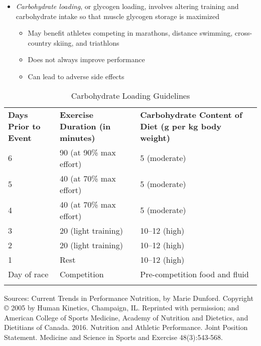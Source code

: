 \documentclass[title={Chapter 11}]{fdsn201notes}
\begin{document}
\begin{itemize}
	\item \emph{Carbohydrate loading}, or glycogen loading, involves altering training and carbohydrate intake so that muscle glycogen storage is maximized
	\begin{itemize}
		\item May benefit athletes competing in marathons, distance swimming, cross-country skiing, and triathlons
		\item Does not always improve performance
		\item Can lead to adverse side effects
	\end{itemize}
\end{itemize}

\begin{table}[H]
	\centering
	\begin{threeparttable}
		\caption{Carbohydrate Loading Guidelines}
		\label{tab:carbohydrate-loading-guidelines}
		\begin{tabular}{p{}p{}p{}}
			\rowcolor{rowdarkgreen}\textbf{Days Prior to Event} & \textbf{Exercise Duration (in minutes)} & \textbf{Carbohydrate Content of Diet (g per kg body weight)}\\
				6 & 90 (at 90\% max effort) & 5 (moderate)\\
				5 & 40 (at 70\% max effort) & 5 (moderate)\\
				4 & 40 (at 70\% max effort) & 5 (moderate)\\
				3 & 20 (light training) & 10--12 (high)\\
				2 & 20 (light training) & 10--12 (high)\\
				1 & Rest & 10--12 (high)\\
				Day of race & Competition & Pre-competition food and fluid\\
			\rowcolor{rowdarkgreen} & & \\
		\end{tabular}
		\begin{tablenotes}
			\small
			\item Sources: Current Trends in Performance Nutrition, by Marie Dunford. Copyright © 2005 by Human Kinetics, Champaign, IL. Reprinted with permission; and American College of Sports Medicine, Academy of Nutrition and Dietetics, and Dietitians of Canada. 2016. Nutrition and Athletic Performance. Joint Position Statement. Medicine and Science in Sports and Exercise 48(3):543-568.
		\end{tablenotes}
	\end{threeparttable}
\end{table}
\end{document}
